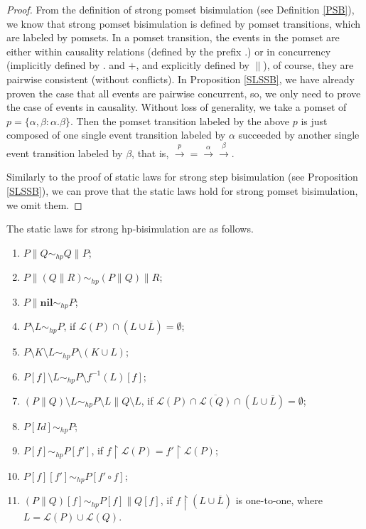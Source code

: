 \begin{proof}
From the definition of strong pomset bisimulation (see Definition \ref{PSB}), we know that strong pomset bisimulation is defined by pomset transitions, which are labeled by pomsets. In a pomset transition, the events in the pomset are either within causality relations (defined by the prefix $.$) or in concurrency (implicitly defined by $.$ and $+$, and explicitly defined by $\parallel$), of course, they are pairwise consistent (without conflicts). In Proposition \ref{SLSSB}, we have already proven the case that all events are pairwise concurrent, so, we only need to prove the case of events in causality. Without loss of generality, we take a pomset of $p=\{\alpha,\beta:\alpha.\beta\}$. Then the pomset transition labeled by the above $p$ is just composed of one single event transition labeled by $\alpha$ succeeded by another single event transition labeled by $\beta$, that is, $\xrightarrow{p}=\xrightarrow{\alpha}\xrightarrow{\beta}$.

Similarly to the proof of static laws for strong step bisimulation (see Proposition \ref{SLSSB}), we can prove that the static laws hold for strong pomset bisimulation, we omit them.
\end{proof}

\begin{proposition} \label{SLSHPB}
The static laws for strong hp-bisimulation are as follows.
\begin{enumerate}
  \item $P\parallel Q\sim_{hp} Q\parallel P$;
  \item $P\parallel(Q\parallel R)\sim_{hp} (P\parallel Q)\parallel R$;
  \item $P\parallel \textbf{nil}\sim_{hp} P$;
  \item $P\setminus L\sim_{hp} P$, if $\mathcal{L}(P)\cap(L\cup\overline{L})=\emptyset$;
  \item $P\setminus K\setminus L\sim_{hp} P\setminus(K\cup L)$;
  \item $P[f]\setminus L\sim_{hp} P\setminus f^{-1}(L)[f]$;
  \item $(P\parallel Q)\setminus L\sim_{hp} P\setminus L\parallel Q\setminus L$, if $\mathcal{L}(P)\cap\overline{\mathcal{L}(Q)}\cap(L\cup\overline{L})=\emptyset$;
  \item $P[Id]\sim_{hp} P$;
  \item $P[f]\sim_{hp} P[f']$, if $f\upharpoonright\mathcal{L}(P)=f'\upharpoonright\mathcal{L}(P)$;
  \item $P[f][f']\sim_{hp} P[f'\circ f]$;
  \item $(P\parallel Q)[f]\sim_{hp} P[f]\parallel Q[f]$, if $f\upharpoonright(L\cup\overline{L})$ is one-to-one, where $L=\mathcal{L}(P)\cup\mathcal{L}(Q)$.
\end{enumerate}
\end{proposition}

